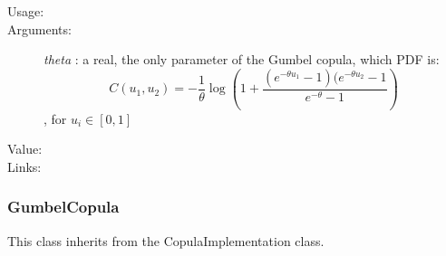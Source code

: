 \begin{description}

\item[Usage:] \rule{0pt}{1em}


\item[Arguments:]  \textit{theta}    : a real, the only parameter of the Gumbel copula, which PDF is:
\begin{equation}
C(u_1, u_2) = \displaystyle -\frac{1}{\theta}\log\left(1+\frac{(e^{-\theta u_1}-1)(e^{-\theta u_2}-1}{e^{-\theta}-1}\right)
\end{equation}, for $u_i \in [0,1]$

\item[Value:]  \rule{0pt}{1em}

\item[Links:]
\end{description}

\newpage
\subsubsection{GumbelCopula}

This class inherits from the CopulaImplementation class.


